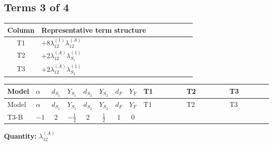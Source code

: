 \documentclass[8pt]{article}
\begin{document}
\begin{landscape}
\subsection*{Terms 3 of 4}
\begin{center}
\begin{tabular}{@{}c >{\raggedright\arraybackslash}p{0.82\linewidth}@{}}
\toprule
Column & Representative term structure \\
\midrule
T1 & \(\displaystyle +8 {\lambda_{12}^{(1)}} {\lambda_{12}^{(A)}}\) \\
\midrule
T2 & \(\displaystyle +2 {\lambda_{12}^{(A)}} {\lambda_{S_1}^{(1)}}\) \\
\midrule
T3 & \(\displaystyle +2 {\lambda_{12}^{(A)}} {\lambda_{S_2}^{(1)}}\) \\
\midrule
\bottomrule
\end{tabular}
\end{center}
\smallskip
\tiny
\begin{longtable}{@{}llcccccc >{\raggedright\arraybackslash}p{0.21\linewidth} >{\raggedright\arraybackslash}p{0.21\linewidth} >{\raggedright\arraybackslash}p{0.21\linewidth}@{}}
\toprule
Model & $\alpha$ & $d_{S_1}$ & $Y_{S_1}$ & $d_{S_2}$ & $Y_{S_2}$ & $d_F$ & $Y_F$ & T1 & T2 & T3 \\
\midrule
\endfirsthead
\toprule
Model & $\alpha$ & $d_{S_1}$ & $Y_{S_1}$ & $d_{S_2}$ & $Y_{S_2}$ & $d_F$ & $Y_F$ & T1 & T2 & T3 \\
\midrule
\endhead
T3-B & $-1$ & $2$ & $-\frac{1}{2}$ & $2$ & $\frac{1}{2}$ & $1$ & $0$ & \scriptsize\adjustbox{max width=\linewidth}{$\begin{gathered} +8 {\lambda_{12}^{(1)}} {\lambda_{12}^{(A)}}\end{gathered}$} & \scriptsize\adjustbox{max width=\linewidth}{$\begin{gathered} +2 {\lambda_{12}^{(A)}} {\lambda_{S_1}^{(1)}}\end{gathered}$} & \scriptsize\adjustbox{max width=\linewidth}{$\begin{gathered} +2 {\lambda_{12}^{(A)}} {\lambda_{S_2}^{(1)}}\end{gathered}$} \\
\midrule
\bottomrule
\end{longtable}
\clearpage
\noindent\textbf{Quantity: }$\lambda_{12}^{(A)}$\par\smallskip

\end{landscape}
\end{document}
